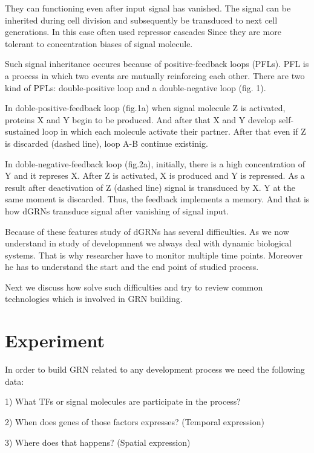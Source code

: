 \documentclass[a4paper, twoside]{report}
\begin{document}
They can functioning even after input signal has vanished.
The signal can be inherited during cell division and subsequently be transduced to next cell generations.
In this case often used repressor cascades
Since they are more tolerant to concentration biases of signal molecule.

Such signal inheritance occures because of positive-feedback loops (PFLs).
PFL is a process in which two events are mutually reinforcing each other.
There are two kind of PFLs: double-positive loop and a double-negative loop (fig. 1).

In doble-positive-feedback loop (fig.1a) when signal molecule Z is activated, proteins X and Y begin to be produced. 
And after that X and Y develop self-sustained loop in which each molecule activate their partner.
After that even if Z is discarded (dashed line), loop A-B continue existinig.

In doble-negative-feedback loop (fig.2a), initially, there is a high concentration of Y and it represes X.
After Z is activated, X is produced and Y is repressed.
As a result after deactivation of Z (dashed line) signal is transduced by X.
Y at the same moment is discarded.
Thus, the feedback implements a memory.
And that is how dGRNs transduce signal after vanishing of signal input.

Because of these features study of dGRNs has several difficulties.
As we now understand in study of developmnent we always deal with dynamic biological systems.
That is why researcher have to monitor multiple time points.
Moreover he has to understand the start and the end point of studied process.

Next we discuss how solve such difficulties and try to review common technologies which is involved in GRN building.   

\section*{Experiment}

In order to build GRN related to any development process we need the following data:

\vspace{2mm}

1) What TFs or signal molecules are participate in the process? 

2) When does genes of those factors expresses? (Temporal expression)

3) Where does that happens? (Spatial expression)
\end{document}
